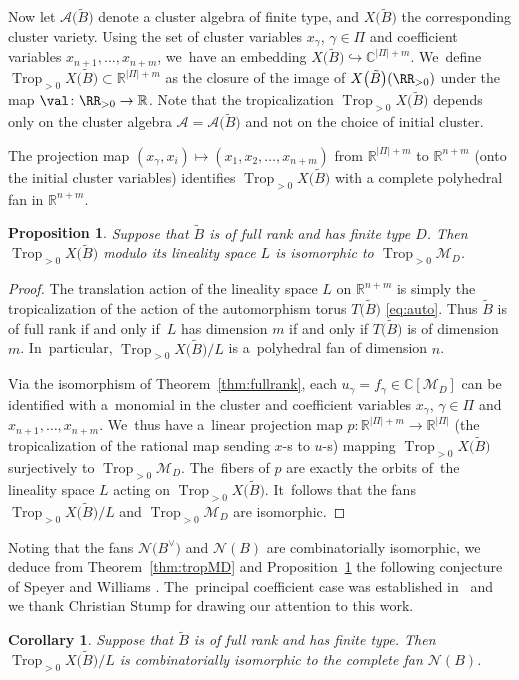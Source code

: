 \documentclass[pdftex]{sigma}%
\def\R{{\mathbb R}}
\def\C{{\mathbb C}}
\def\A{{\mathcal{A}}}
\def\tB{{\tilde B}}
\def\M{{\mathcal{M}}}
\def\tB{{\tilde B}}
\def\N{{\mathcal{N}}}
\def\Trop{\operatorname{Trop}}
\numberwithin{equation}{section}
\newtheorem{Corollary}[Theorem]{Corollary}
\newtheorem{Proposition}[Theorem]{Proposition}
\begin{document}
Now let $\A\big(\tB\big)$ denote a cluster algebra of finite type, and $X\big(\tB\big)$ the corresponding cluster variety. Using the set of cluster variables $x_\gamma$, $\gamma \in \Pi$ and coefficient variables $x_{n+1},\dots,x_{n+m}$, we~have an embedding $X\big(\tB\big) \hookrightarrow \C^{|\Pi|+m}$. We~define $\Trop_{>0}X\big(\tB\big) \subset \R^{|\Pi|+m}$ as the closure of the image of $X\big(\tB\big)(\RR_{>0})$ under the map $\val\colon \RR_{>0} \to \R$. Note that the tropicalization $\Trop_{>0}X\big(\tB\big)$ depends only on the cluster algebra $\A = \A\big(\tB\big)$ and not on the choice of initial cluster.

The projection map $(x_\gamma,x_i) \mapsto (x_1,x_2,\dots,x_{n+m})$ from $\R^{|\Pi|+m}$ to $\R^{n+m}$ (onto the initial cluster variables) identifies $\Trop_{>0}X\big(\tB\big)$ with a complete polyhedral fan in $\R^{n+m}$.

\begin{Proposition}\label{prop:modL}
Suppose that $\tB$ is of full rank and has finite type $D$. Then $\Trop_{>0} X\big(\tB\big)$ modulo its lineality space $L$ is isomorphic to $\Trop_{>0}\M_D$.
\end{Proposition}
\begin{proof}
The translation action of the lineality space $L$ on $\R^{n+m}$ is simply the tropicalization of the action of the automorphism torus $T\big(\tB\big)$ \eqref{eq:auto}. Thus $\tB$ is of full rank if and only if~$L$ has dimension $m$ if and only if $T\big(\tB\big)$ is of dimension $m$. In~particular, $\Trop_{>0}X\big(\tB\big)/L$ is a~polyhedral fan of dimension $n$.

Via the isomorphism of Theorem~\ref{thm:fullrank}, each $u_\gamma = f_\gamma \in \C[\M_D]$ can be identified with a~monomial in the cluster and coefficient variables $x_\gamma$, $\gamma \in \Pi$ and $x_{n+1},\dots,x_{n+m}$. We~thus have a~linear projection map $p\colon \R^{|\Pi|+m} \to \R^{|\Pi|}$ (the tropicalization of the rational map sending $x$-s to $u$-s) mapping $\Trop_{>0} X\big(\tB\big)$ surjectively to $\Trop_{>0} \M_D$. The~fibers of $p$ are exactly the orbits of~the lineality space $L$ acting on $\Trop_{>0} X\big(\tB\big)$. It~follows that the fans $\Trop_{>0}X\big(\tB\big)/L$ and $\Trop_{>0} \M_D$ are isomorphic.
\end{proof}

Noting that the fans $\N\big(B^\vee\big)$ and $\N(B)$ are combinatorially isomorphic, we deduce from Theorem~\ref{thm:tropMD} and Proposition~\ref{prop:modL} the following conjecture of Speyer and Williams \cite[Conjecture~8.1]{SW}. The~principal coefficient case was established in~\cite{JLS} and we thank Christian Stump for drawing our attention to this work.
\begin{Corollary}
Suppose that $\tB$ is of full rank and has finite type. Then $\Trop_{>0}X\big(\tB\big)/L$ is combinatorially isomorphic to the complete fan $\N(B)$.
\end{Corollary}
\end{document}
